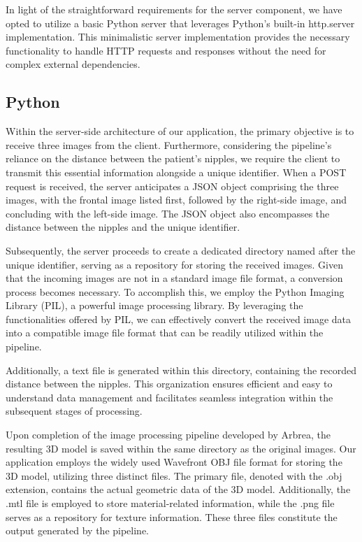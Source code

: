 In light of the straightforward requirements for the server component, we have opted to utilize a basic Python server that leverages Python's built-in http.server implementation. 
This minimalistic server implementation provides the necessary functionality to handle HTTP requests and responses without the need for complex external dependencies.

\subsection{Python}

Within the server-side architecture of our application, the primary objective is to receive three images from the client. Furthermore, considering the pipeline's reliance on the distance 
between the patient's nipples, we require the client to transmit this essential information alongside a unique identifier. When a POST request is received, the server anticipates a JSON object 
comprising the three images, with the frontal image listed first, followed by the right-side image, and concluding with the left-side image. The JSON object also encompasses the distance 
between the nipples and the unique identifier.

Subsequently, the server proceeds to create a dedicated directory named after the unique identifier, serving as a repository for storing the received images. Given that the incoming 
images are not in a standard image file format, a conversion process becomes necessary. To accomplish this, we employ the Python Imaging Library (PIL), a powerful image processing library. 
By leveraging the functionalities offered by PIL, we can effectively convert the received image data into a compatible image file format that can be readily utilized within the pipeline. 

Additionally, a text file is generated within this directory, containing the recorded distance between the nipples. 
This organization ensures efficient and easy to understand data management and facilitates seamless integration within the subsequent stages of processing.

Upon completion of the image processing pipeline developed by Arbrea, the resulting 3D model is saved within the same directory as the original images. 
Our application employs the widely used Wavefront OBJ file format for storing the 3D model, utilizing three distinct files. The primary file, 
denoted with the .obj extension, contains the actual geometric data of the 3D model. Additionally, the .mtl file is employed to store material-related information, 
while the .png file serves as a repository for texture information. These three files constitute the output generated by the pipeline.

